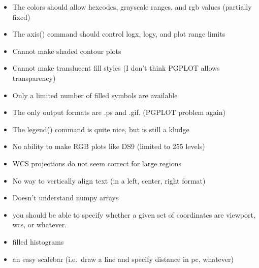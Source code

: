 \documentclass[12pt]{article}
\begin{document}
\begin{itemize}
\item The colors should allow hexcodes, grayscale ranges, and rgb values
(partially fixed)
\item The axis() command should control logx, logy, and plot range limits
\item Cannot make shaded contour plots
\item Cannot make translucent fill styles (I don't think PGPLOT allows
transparency)
\item Only a limited number of filled symbols are available
\item The only output formats are .ps and .gif. (PGPLOT problem again)
\item The legend() command is quite nice, but is still a kludge
\item No ability to make RGB plots like DS9 (limited to 255 levels)
\item WCS projections do not seem correct for large regions
\item No way to vertically align text (in a left, center, right format)
\item Doesn't understand numpy arrays
\item you should be able to specify whether a given set of coordinates are
viewport, wcs, or whatever.
\item filled histograms
\item an easy scalebar (i.e.\ draw a line and specify distance in pc, whatever)
\end{itemize}
\end{document}
